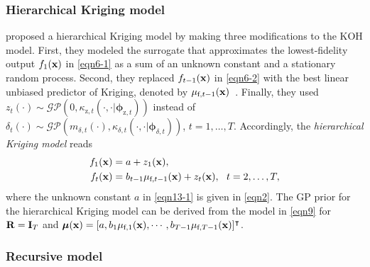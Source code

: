 \documentclass[journal ]{new-aiaa}
\begin{document}
	\subsubsection{Hierarchical Kriging model}\label{Sec422}
	
	\citet{Han2012} proposed a hierarchical Kriging model by making three modifications to the KOH model.
	First, they modeled the surrogate that approximates the lowest-fidelity output $f_1({\bf x})$ in \cref{eqn6-1} as a sum of an unknown constant and a stationary random process.
	Second, they replaced $f_{t-1}({\bf x})$ in \cref{eqn6-2} with the best linear unbiased predictor of Kriging, denoted by $\mu_{\text{f},t-1}({\bf x})$~\citep{Sacks1989}.
	Finally, they used $z_t({\cdot}) \sim \mathcal{GP}\left(0,\kappa_{\text{z},t}(\cdot,\cdot|{\boldsymbol \phi}_{\text{z},t})\right)$ instead of $\delta_{t}(\cdot) \sim \mathcal{GP}\left(m_{\delta,t}(\cdot),\kappa_{\delta,t}(\cdot,\cdot|{\boldsymbol \phi}_{\delta,t})\right)$, $t=1,\dots,T$.
	Accordingly, the \textit{hierarchical Kriging model} reads
	\begin{subequations}\label{eqn13}
		\begin{align}
			f_1({\bf x}) & = a + z_1({\bf x}) 
			\label{eqn13-1},\\
			f_t({\bf x}) & =
			b_{t-1} \mu_{\text{f},t-1}({\bf x}) + z_{t}({\bf x}), \ \  t=2,\dots,T
			\label{eqn13-2},
		\end{align}
	\end{subequations}
	where the unknown constant $a$ in \cref{eqn13-1} is given in \cref{eqn2}.
	The GP prior for the hierarchical Kriging model can be derived from the model in \cref{eqn9} for ${\bf R}={\bf I}_T$ and $\boldsymbol{\mu}({\bf x}) = [a,b_1 \mu_{\text{f},1}({\bf x}),\cdots,b_{T-1} \mu_{\text{f},T-1}({\bf x})]^\intercal$.
	
	\subsubsection{Recursive model}\label{Sec423}
	
\end{document}

